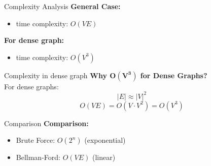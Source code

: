 \documentclass{beamer}
\begin{document}
    \begin{frame}{Complexity Analysis}
        \textbf{General Case:}
        \begin{itemize}
            \item  time complexity: $O(VE)$ 
        \end{itemize}
    
        \textbf{For dense graph:}
        \begin{itemize}
            \item time complexity: $O(V^3)$
        \end{itemize} 
    \end{frame}

    \begin{frame} {Complexity in dense graph}
        \textbf{Why $\mathbf{O(V^3)}$ for Dense Graphs?} \\
        For dense graphs: 
        \[ |E| \approx |V|^2 \]
        \[ O(VE) = O(V \cdot V^2) = O(V^3) \]
    \end{frame}

    \begin{frame} {Comparison}
        \textbf{Comparison:}
        \begin{itemize}
            \item Brute Force: $O(2^n)$ (exponential)
            \item Bellman-Ford: $O(VE)$ (linear)
        \end{itemize}
    \end{frame}
    
\end{document}
